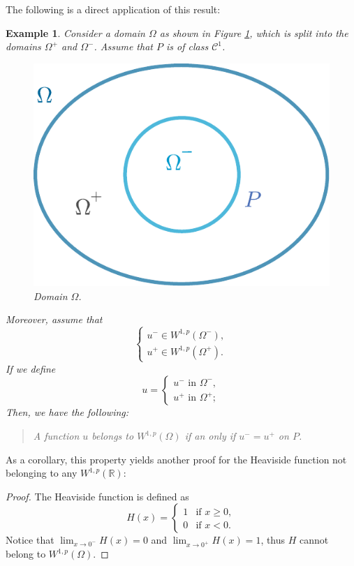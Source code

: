 \documentclass[a4paper,doc,11pt]{article}
\newtheorem{example}[theorem]{Example}
\newcommand{\R}{\mathbb{R}}
\newcommand{\CC}{\mathcal{C}}
\begin{document}
The following is a direct application of this result:

\begin{example}
    Consider a domain \(\Omega\) as shown in Figure \ref{fig:3-Split}, which is split into the domains \(\Omega^+\) and \(\Omega^-\). Assume that \( P\) is of class \(\CC^1\). 
    \begin{figure}
        \centering
        \includegraphics[scale=0.5]{Fig-3_Domains.pdf}
        \caption{Domain \(\Omega\).}
        \label{fig:3-Split}
    \end{figure}
    Moreover, assume that
    \[
        \begin{cases}
            u^- \in W^{1,p}(\Omega^-),
            \\
            u^+ \in W^{1,p}(\Omega^+).
        \end{cases}
    \]
    If we define
    \[
        u = 
        \begin{cases}
            u^- \text{ in } \Omega^-,
            \\
            u^+ \text{ in } \Omega^+;
        \end{cases}
    \]
    Then, we have the following: 
    \begin{quote}
        A function \(u\) belongs to \( W^{1,p} (\Omega)\) if an only if \(u^- = u^+\) on \(P\).
    \end{quote}
\end{example}

As a corollary, this property yields another proof for the Heaviside function not belonging to any \(W^{1,p}(\R)\):
\begin{proof}
    The Heaviside function is defined as
    \[
        H(x) =
        \begin{cases}
            1 & \text{if } x \geq 0,
            \\
            0 & \text{if } x <0.
        \end{cases}
    \]
    Notice that \( \lim_{x\to 0^-} H(x) = 0\) and \( \lim_{x\to 0^+} H(x) = 1\), thus \(H\) cannot belong to \(W^{1,p}(\Omega)\).
\end{proof}
\end{document}
